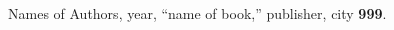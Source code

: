 \documentclass[aps,twocolumn,pre,nofootinbib]{revtex4-1}
\begin{document}


\begin{thebibliography}{5}

\bibitem[Reflabel]  Names of Authors, year, ``name of book,'' publisher, city {\bf 999}.


\end{thebibliography}
\end{document}
